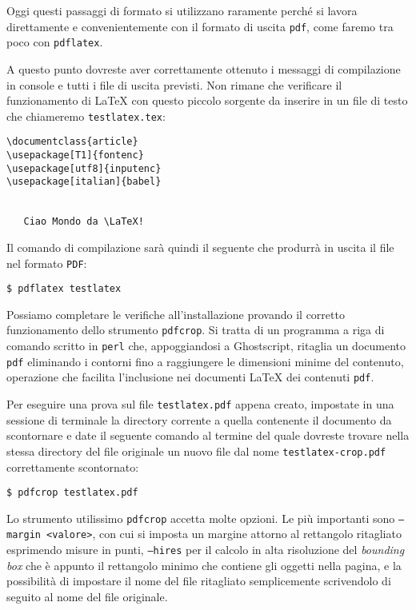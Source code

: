 Oggi questi passaggi di formato si utilizzano raramente perché si lavora direttamente e convenientemente con il formato di uscita \texttt{pdf}, come faremo tra poco con \texttt{pdflatex}.

A questo punto dovreste aver correttamente ottenuto i messaggi di compilazione in console e tutti i file di uscita previsti. Non rimane che verificare il funzionamento di \LaTeX{} con questo piccolo sorgente da inserire in un file di testo che chiameremo \texttt{testlatex.tex}:
\begin{Verbatim}[fontsize=\small]
\documentclass{article}
\usepackage[T1]{fontenc}
\usepackage[utf8]{inputenc}
\usepackage[italian]{babel}


   Ciao Mondo da \LaTeX!

\end{Verbatim}

Il comando di compilazione sarà quindi il seguente che produrrà in uscita il file nel formato \texttt{PDF}:
\begin{verbatim}
$ pdflatex testlatex
\end{verbatim}

Possiamo completare le verifiche all'installazione provando il corretto funzionamento dello strumento \texttt{pdfcrop}. Si tratta di un programma a riga di comando scritto in \texttt{perl} che, appoggiandosi a \textsf{Ghostscript}, ritaglia un documento \texttt{pdf} eliminando i contorni fino a raggiungere le dimensioni minime del contenuto, operazione che facilita l'inclusione nei documenti \LaTeX{} dei contenuti \texttt{pdf}.

Per eseguire una prova sul file \texttt{testlatex.pdf} appena creato, impostate in una sessione di terminale la directory corrente a quella contenente il documento da scontornare e date il seguente comando al termine del quale dovreste trovare nella stessa directory del file originale un nuovo file dal nome \texttt{testlatex-crop.pdf} correttamente scontornato:
\begin{verbatim}
$ pdfcrop testlatex.pdf
\end{verbatim}

Lo strumento utilissimo \texttt{pdfcrop} accetta molte opzioni. Le più importanti sono \texttt{--margin <valore>}, con cui si imposta un margine attorno al rettangolo ritagliato esprimendo misure in punti, \texttt{--hires} per il calcolo in alta risoluzione del \emph{bounding box} che è appunto il rettangolo minimo che contiene gli oggetti nella pagina, e la possibilità di impostare il nome del file ritagliato semplicemente scrivendolo di seguito al nome del file originale.

